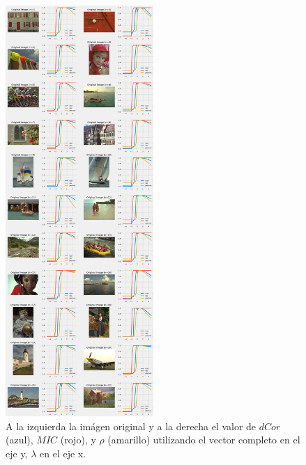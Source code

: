 \begin{figure}
    \centering
    \includegraphics[width=0.5\textwidth]{figuras/full_comp.png}
    \caption{A la izquierda la im\'agen original y a la derecha el valor de $dCor$ (azul), $MIC$ (rojo), y $\rho$ (amarillo) utilizando el vector completo en el eje y, $\lambda$ en el eje x.}
\end{figure}

